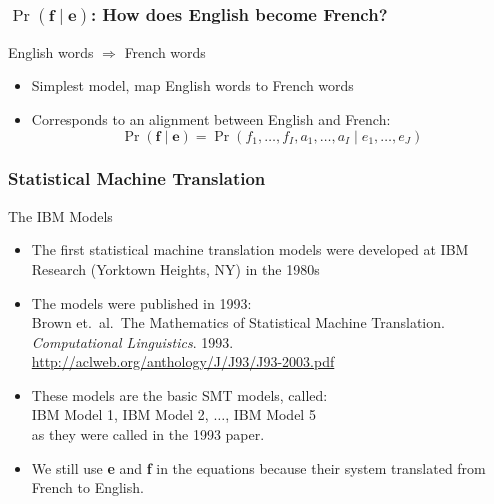 \begin{frame}
\frametitle{$\Pr( \textbf{f} \mid \textbf{e} )$: How does English become French?}
\begin{alertblock}{English words $\Rightarrow$ French words}
\begin{itemize}
\item Simplest model, map English words to French words
\item Corresponds to an alignment between English and French:
\[ \Pr( \textbf{f} \mid \textbf{e} ) = \Pr(f_1, \ldots, f_I, a_1, \ldots, a_I \mid e_1, \ldots, e_J) \]
\end{itemize}
\end{alertblock}
\end{frame}

\begin{frame}
\frametitle{Statistical Machine Translation}
\begin{block}{The IBM Models}
\begin{itemize}[<+->]
\item The first statistical machine translation models were developed at IBM Research (Yorktown Heights, NY) in the 1980s
\item The models were published in 1993: \\
{\small Brown et.\ al.\ The Mathematics of Statistical Machine Translation. \textit{Computational Linguistics}. 1993.} \\
{\small \url{http://aclweb.org/anthology/J/J93/J93-2003.pdf}}
\item These models are the basic SMT models, called: \\
IBM Model 1, IBM Model 2, $\ldots$, IBM Model 5 \\
as they were called in the 1993 paper.
\item We still use \textbf{e} and \textbf{f} in the equations because their system translated from French to English.
\end{itemize}
\end{block}
\end{frame}

